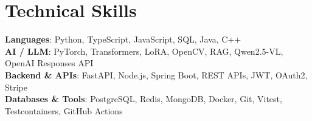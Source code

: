 \section{Technical Skills}
 \begin{itemize}[leftmargin=0.15in, label={}]
    \small{\item{
     \textbf{Languages}{: Python, TypeScript, JavaScript, SQL, Java, C++} \\
     \textbf{AI / LLM}{: PyTorch, Transformers, LoRA, OpenCV, RAG, Qwen2.5-VL, OpenAI Responses API} \\
     \textbf{Backend \& APIs}{: FastAPI, Node.js, Spring Boot, REST APIs, JWT, OAuth2, Stripe} \\
     \textbf{Databases \& Tools}{: PostgreSQL, Redis, MongoDB, Docker, Git, Vitest, Testcontainers, GitHub Actions}
    }}
 \end{itemize}


